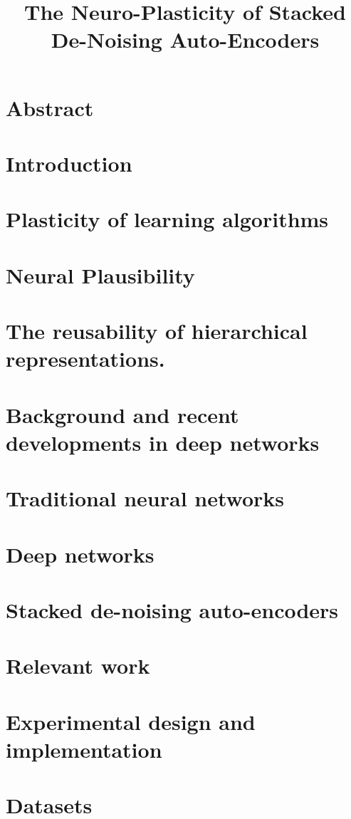 \documentclass[12pt]{article}
\begin{document}
         

\section{Abstract}
\label{Abstract}
\doublespacing

\title{The Neuro-Plasticity of Stacked De-Noising Auto-Encoders}

\section{Introduction}
	\section{Plasticity of learning algorithms}
	\section{Neural Plausibility}
	\section{The reusability of hierarchical representations.}
\section{Background and recent developments in deep networks}
	\section{Traditional neural networks}
	\section{Deep networks}
	\section{Stacked de-noising auto-encoders}
	\section{Relevant work}
\section{Experimental design and implementation}
	\section{Datasets}
\end{document}
